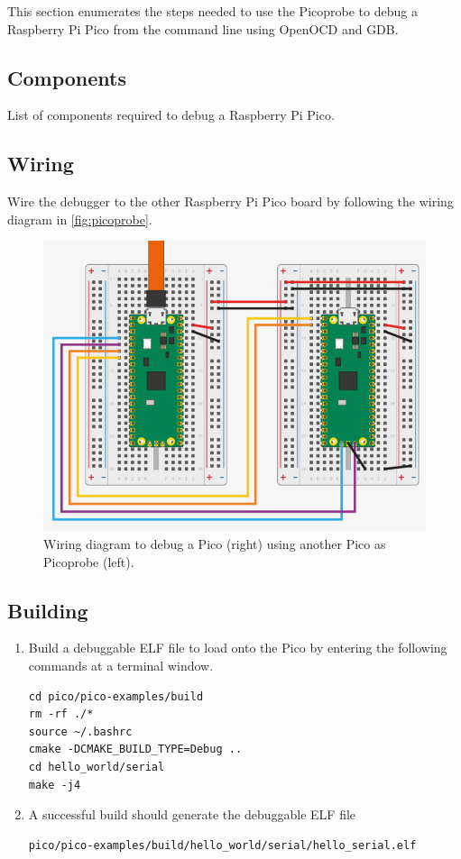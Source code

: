 This section enumerates the steps needed to use the Picoprobe to debug
a Raspberry Pi Pico from the command line using OpenOCD and GDB.

\subsection{Components}
\begin{table}[!ht]
    
    \caption{List of components required to debug a Raspberry Pi Pico.}
    \label{tab:rpi-comp}
\end{table}

\subsection{Wiring}
Wire the debugger to the other Raspberry Pi Pico board by following the wiring
diagram in \autoref{fig:picoprobe}.
\begin{figure}[!ht]
    \includegraphics[width=\columnwidth]{picoprobe/rpi/figs/picoprobe.png}
    \caption{Wiring diagram to debug a Pico (right) using another Pico as Picoprobe (left).}
    \label{fig:picoprobe}
\end{figure}

\subsection{Building}
\begin{enumerate}
    \item Build a debuggable ELF file to load onto the Pico by entering the
    following commands at a terminal window.
    \begin{lstlisting}
cd pico/pico-examples/build
rm -rf ./*
source ~/.bashrc
cmake -DCMAKE_BUILD_TYPE=Debug ..
cd hello_world/serial
make -j4
    \end{lstlisting}
    \item A successful build should generate the debuggable ELF file
    \begin{lstlisting}
pico/pico-examples/build/hello_world/serial/hello_serial.elf
    \end{lstlisting}
\end{enumerate}


